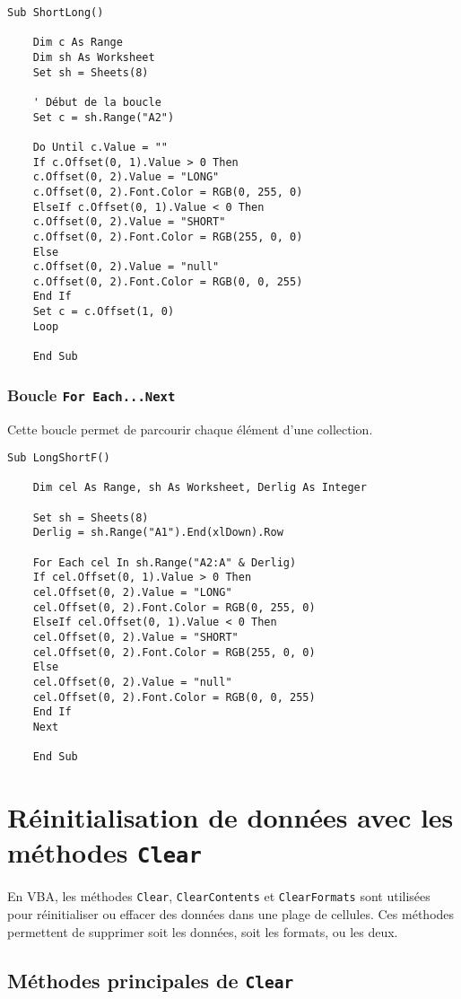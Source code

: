 \documentclass[a4paper,12pt]{report}
\begin{document}
\begin{lstlisting}[caption=Exemple de boucle Do Until...Loop]
	Sub ShortLong()
	
	Dim c As Range
	Dim sh As Worksheet
	Set sh = Sheets(8)
	
	' Début de la boucle
	Set c = sh.Range("A2")
	
	Do Until c.Value = ""
	If c.Offset(0, 1).Value > 0 Then
	c.Offset(0, 2).Value = "LONG"
	c.Offset(0, 2).Font.Color = RGB(0, 255, 0)
	ElseIf c.Offset(0, 1).Value < 0 Then
	c.Offset(0, 2).Value = "SHORT"
	c.Offset(0, 2).Font.Color = RGB(255, 0, 0)
	Else
	c.Offset(0, 2).Value = "null"
	c.Offset(0, 2).Font.Color = RGB(0, 0, 255)
	End If
	Set c = c.Offset(1, 0)
	Loop
	
	End Sub
\end{lstlisting}
\newpage
\subsection{Boucle \texttt{For Each...Next}}
Cette boucle permet de parcourir chaque élément d'une collection.

\begin{lstlisting}[caption=Exemple de boucle For Each...Next]
	Sub LongShortF()
	
	Dim cel As Range, sh As Worksheet, Derlig As Integer
	
	Set sh = Sheets(8)
	Derlig = sh.Range("A1").End(xlDown).Row
	
	For Each cel In sh.Range("A2:A" & Derlig)
	If cel.Offset(0, 1).Value > 0 Then
	cel.Offset(0, 2).Value = "LONG"
	cel.Offset(0, 2).Font.Color = RGB(0, 255, 0)
	ElseIf cel.Offset(0, 1).Value < 0 Then
	cel.Offset(0, 2).Value = "SHORT"
	cel.Offset(0, 2).Font.Color = RGB(255, 0, 0)
	Else
	cel.Offset(0, 2).Value = "null"
	cel.Offset(0, 2).Font.Color = RGB(0, 0, 255)
	End If
	Next
	
	End Sub
\end{lstlisting}

\chapter{Réinitialisation de données avec les méthodes \texttt{Clear}}

En VBA, les méthodes \texttt{Clear}, \texttt{ClearContents} et \texttt{ClearFormats} sont utilisées pour réinitialiser ou effacer des données dans une plage de cellules. Ces méthodes permettent de supprimer soit les données, soit les formats, ou les deux.

\section{Méthodes principales de \texttt{Clear}}
\end{document}
